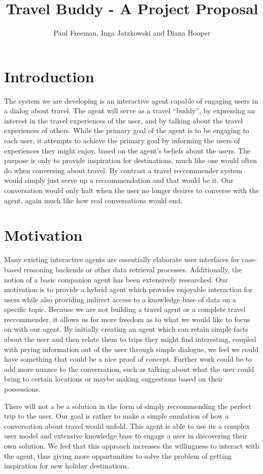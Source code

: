 \documentclass[11pt]{article} %
\title{Travel Buddy - A Project Proposal}
\author{Paul Freeman, Inga Jatzkowski and Diana Hooper}
\begin{document}
\maketitle
\newpage
\section{Introduction}
The system we are developing is an interactive agent capable of
engaging users in a dialog about travel. The agent will serve as
a travel ``buddy'', by expressing an interest in the travel
experiences of the user, and by talking about the travel
experiences of others. While the primary goal of the agent is
to be engaging to each user, it attempts to achieve the primary
goal by informing the users of experiences they might enjoy,
based on the agent’s beliefs about the users. The purpose is only to provide inspiration for destinations, much like one would often do when conversing about travel. By contrast a travel reccommender system would simply just serve up a reccommendation and that would be it. Our conversation would only halt when the user no longer desires to converse with the agent, again much like how real conversations would end.

\section{Motivation}
Many existing interactive agents are essentially elaborate user
interfaces for case-based reasoning backends or other data retrieval
processes. Additionally, the notion of a basic companion agent has been
extensively researched. Our motivation is to provide a hybrid agent
which provides enjoyable interaction for users while also providing
indirect access to a knowledge base of data on a specific topic.
Because we are not building a travel agent or a complete travel reccommender,
it allows us for more freedom as to what we would like to focus on with our agent. By initially 
creating an agent which can retain simple facts about the user and then relate them to trips 
they might find interesting, coupled with prying information out of the user through simple dialogue, we feel we could have something
that could be a nice proof of concept. Further work could be to add more nuance to the conversation, such as talking about what the user could bring to certain locations or maybe making suggestions based on their possessions.

There will not a be a solution in the form of simply reccommending the perfect trip to the user. Our goal is rather to make a simple emulation of how a conversation about travel would unfold. This agent is able to use its a complex user model and extensive
knowledge base to engage a user in discovering their own solution.
We feel that this approach increases the willingness to interact
with the agent, thus giving more opportunities to solve the problem of getting inspiration for new holiday destinations.
\end{document}
